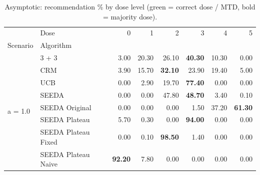 \begin{table}[H]
\centering
\caption{Asymptotic: recommendation \% by dose level (green = correct dose / MTD, bold = majority dose).}
\label{tab:asym_rec_by_dose}
\begin{tabular}{llrrrrrr}
\toprule
 & Dose & 0 & 1 & 2 & 3 & 4 & 5 \\
Scenario & Algorithm &  &  &  &  &  &  \\
\midrule
\multirow[c]{8}{*}{a = 1.0} & 3 + 3 & 3.00 & 20.30 & {\cellcolor[HTML]{C8E6C9}} 26.10 & \bfseries 40.30 & 10.30 & 0.00 \\
 & CRM & 3.90 & 15.70 & {\cellcolor[HTML]{C8E6C9}} \bfseries 32.10 & 23.90 & 19.40 & 5.00 \\
 & UCB & 0.00 & 2.90 & {\cellcolor[HTML]{C8E6C9}} 19.70 & \bfseries 77.40 & 0.00 & 0.00 \\
 & SEEDA & 0.00 & 0.00 & {\cellcolor[HTML]{C8E6C9}} 47.80 & \bfseries 48.70 & 3.40 & 0.10 \\
 & SEEDA Original & 0.00 & 0.00 & {\cellcolor[HTML]{C8E6C9}} 0.00 & 1.50 & 37.20 & \bfseries 61.30 \\
 & SEEDA Plateau & 5.70 & 0.30 & {\cellcolor[HTML]{C8E6C9}} 0.00 & \bfseries 94.00 & 0.00 & 0.00 \\
 & SEEDA Plateau Fixed & 0.00 & 0.10 & {\cellcolor[HTML]{C8E6C9}} \bfseries 98.50 & 1.40 & 0.00 & 0.00 \\
 & SEEDA Plateau Naive & \bfseries 92.20 & 7.80 & {\cellcolor[HTML]{C8E6C9}} 0.00 & 0.00 & 0.00 & 0.00 \\
\bottomrule
\end{tabular}
\end{table}
